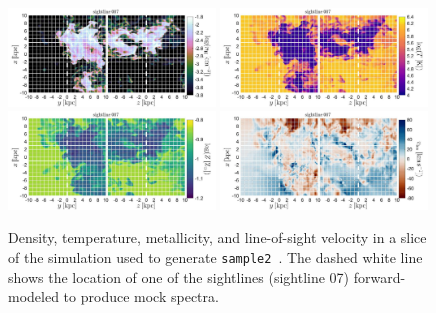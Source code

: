 \documentclass[fleqn,usenatbib]{mnras}
\begin{document}
\begin{figure}
    \centering
    \includegraphics[width=0.49\textwidth]{figures/sample2/projections/density_projection_maps_SL_07.jpg}
    \includegraphics[width=0.49\textwidth]{figures/sample2/projections/temperature_projection_maps_SL_07.jpg} \\
    \includegraphics[width=0.49\textwidth]{figures/sample2/projections/metallicity_projection_maps_SL_07.jpg}
    \includegraphics[width=0.49\textwidth]{figures/sample2/projections/velocity_projection_maps_SL_07.jpg}
    \caption{
    Density, temperature, metallicity, and line-of-sight velocity in a slice of the simulation used to generate \texttt{sample2}~\citep{mandelker2020Instability}.
    The dashed white line shows the location of one of the sightlines (sightline 07) forward-modeled to produce mock spectra.
    }
    \label{f: sample2 ray 07}
\end{figure}
\end{document}
